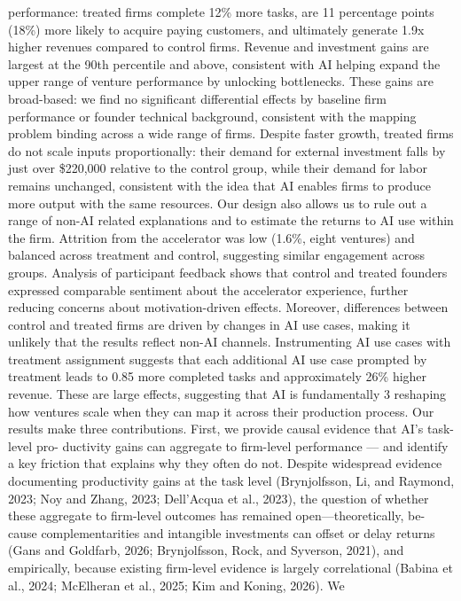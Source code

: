performance: treated firms complete 12\% more tasks, are 11 percentage points (18\%) more likely
to acquire paying customers, and ultimately generate 1.9x higher revenues compared to control
firms. Revenue and investment gains are largest at the 90th percentile and above, consistent with
AI helping expand the upper range of venture performance by unlocking bottlenecks. These gains
are broad-based: we find no significant differential effects by baseline firm performance or founder
technical background, consistent with the mapping problem binding across a wide range of firms.
Despite faster growth, treated firms do not scale inputs proportionally: their demand for external
investment falls by just over \$220,000 relative to the control group, while their demand for labor
remains unchanged, consistent with the idea that AI enables firms to produce more output with the
same resources.
Our design also allows us to rule out a range of non-AI related explanations and to estimate the
returns to AI use within the firm. Attrition from the accelerator was low (1.6\%, eight ventures) and
balanced across treatment and control, suggesting similar engagement across groups. Analysis of
participant feedback shows that control and treated founders expressed comparable sentiment about
the accelerator experience, further reducing concerns about motivation-driven effects. Moreover,
differences between control and treated firms are driven by changes in AI use cases, making it unlikely
that the results reflect non-AI channels. Instrumenting AI use cases with treatment assignment
suggests that each additional AI use case prompted by treatment leads to 0.85 more completed tasks
and approximately 26\% higher revenue. These are large effects, suggesting that AI is fundamentally
3
reshaping how ventures scale when they can map it across their production process.
Our results make three contributions. First, we provide causal evidence that AI’s task-level pro-
ductivity gains can aggregate to firm-level performance — and identify a key friction that explains
why they often do not. Despite widespread evidence documenting productivity gains at the task
level (Brynjolfsson, Li, and Raymond, 2023; Noy and Zhang, 2023; Dell’Acqua et al., 2023), the
question of whether these aggregate to firm-level outcomes has remained open—theoretically, be-
cause complementarities and intangible investments can offset or delay returns (Gans and Goldfarb,
2026; Brynjolfsson, Rock, and Syverson, 2021), and empirically, because existing firm-level evidence
is largely correlational (Babina et al., 2024; McElheran et al., 2025; Kim and Koning, 2026). We
